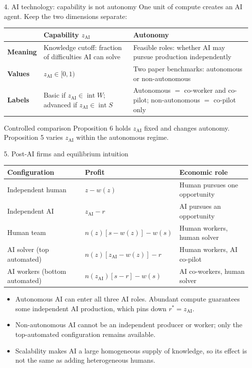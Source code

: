 \documentclass[aspectratio=169,11pt]{beamer}
\newcommand{\zAI}{z_{\mathrm{AI}}}
\begin{document}
\begin{frame}{4. AI technology: capability is not autonomy}
  One unit of compute creates an AI agent. Keep the two dimensions separate:

  \medskip
  \begin{tabular}{>{\bfseries}p{}p{}p{}}
    \toprule
      & Capability $\zAI$ & Autonomy \\
    \midrule
    Meaning
      & Knowledge cutoff: fraction of difficulties AI can solve
      & Feasible roles: whether AI may pursue production independently \\[1mm]
    Values
      & $\zAI\in[0,1)$
      & Two paper benchmarks: autonomous or non-autonomous \\[1mm]
    Labels
      & Basic if $\zAI\in\operatorname{int}W$; advanced if $\zAI\in\operatorname{int}S$
      & Autonomous $=$ co-worker and co-pilot; non-autonomous $=$ co-pilot only \\
    \bottomrule
  \end{tabular}

  \medskip
  \begin{block}{Controlled comparison}
    Proposition 6 holds $\zAI$ fixed and changes autonomy. Proposition 5 varies $\zAI$ within the autonomous regime.
  \end{block}
\end{frame}

\begin{frame}{5. Post-AI firms and equilibrium intuition}
  \small
  \renewcommand{\arraystretch}{1.18}
  \begin{tabular}{p{}p{}p{}}
    \toprule
    Configuration & Profit & Economic role \\
    \midrule
    Independent human & $z-w(z)$ & Human pursues one opportunity \\
    Independent AI & $\zAI-r$ & AI pursues an opportunity \\
    Human team & $n(z)[s-w(z)]-w(s)$ & Human workers, human solver \\
    AI solver (top automated) & $n(z)[\zAI-w(z)]-r$ & Human workers, AI co-pilot \\
    AI workers (bottom automated) & $n(\zAI)[s-r]-w(s)$ & AI co-workers, human solver \\
    \bottomrule
  \end{tabular}

  \medskip
  \begin{itemize}\small
    \item Autonomous AI can enter all three AI roles. Abundant compute guarantees some independent AI production, which pins down $r^*=\zAI$.
    \item Non-autonomous AI cannot be an independent producer or worker; only the top-automated configuration remains available.
    \item Scalability makes AI a large homogeneous supply of knowledge, so its effect is not the same as adding heterogeneous humans.
  \end{itemize}
\end{frame}
\end{document}
